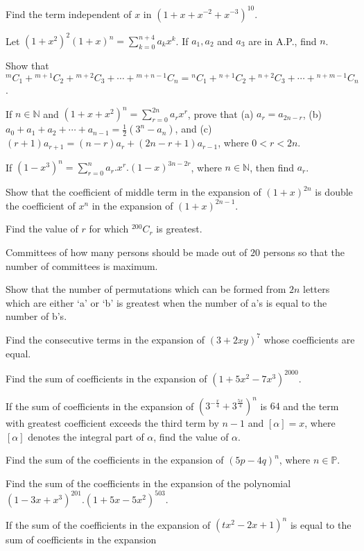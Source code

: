 \item Find the term independent of $x$ in $(1 + x + x^{-2} + x^{-3})^{10}$.
\item Let $\displaystyle(1 + x^2)^2(1 + x)^n = \sum_{k=0}^{n+4}a_kx^k$. If $a_1, a_2$ and $a_3$ are in A.P., find $n$.
\item Show that ${}^mC_1 + {}^{m + 1}C_2 + {}^{m + 2}C_3 + \cdots + {}^{m + n - 1}C_n = {}^nC_1 + {}^{n + 1}C_2 + {}^{n + 2}C_3 +
  \cdots + {}^{n + m - 1}C_n$.
\item If $\displaystyle n\in\mathbb{N}$ and $(1 + x + x^2)^n = \sum_{r=0}^{2n}a_rx^r$, prove that (a) $a_r = a_{2n - r}$, (b) $a_0
  + a_1 + a_2 + \cdots + a_{n - 1} = \frac{1}{2}(3^n - a_n)$, and (c) $(r+1)a_{r + 1} = (n - r)a_r + (2n - r + 1)a_{r - 1}$, where
  $0<r<2n$.
\item If $\displaystyle(1 - x^3)^n = \sum_{r=0}^na_r.x^r.(1 - x)^{3n- 2r}$, where $n\in\mathbb{N}$, then find $a_r$.
\item Show that the coefficient of middle term in the expansion of $(1 + x)^{2n}$ is double the coefficient of $x^n$ in the
  expansion of $(1 + x)^{2n - 1}$.
\item Find the value of $r$ for which ${}^{200}C_r$ is greatest.
\item Committees of how many persons should be made out of $20$ persons so that the number of committees is maximum.
\item Show that the number of permutations which can be formed from $2n$ letters which are either `a' or `b' is greatest when the
  number of a's is equal to the number of b's.
\item Find the consecutive terms in the expansion of $(3 + 2xy)^7$ whose coefficients are equal.
\item Find the sum of coefficients in the expansion of $(1 + 5x^2 - 7x^3)^{2000}$.
\item If the sum of coefficients in the expansion of $\left(3^{-\tfrac{x}{4}} + 3^{\tfrac{5x}{4}}\right)^n$ is $64$ and the term
  with greatest coefficient exceeds the third term by $n- 1$ and $[\alpha] = x$, where $[\alpha]$ denotes the integral part of
  $\alpha$, find the value of $\alpha$.
\item Find the sum of the coefficients in the expansion of $(5p- 4q)^n$, where $n\in\mathbb{P}$.
\item Find the sum of the coefficients in the expansion of the polynomial $(1 - 3x + x^3)^{201}.(1 + 5x - 5x^2)^{503}$.
\item If the sum of the coefficients in the expansion of $(tx^2 - 2x + 1)^n$ is equal to the sum of coefficients in the expansion
